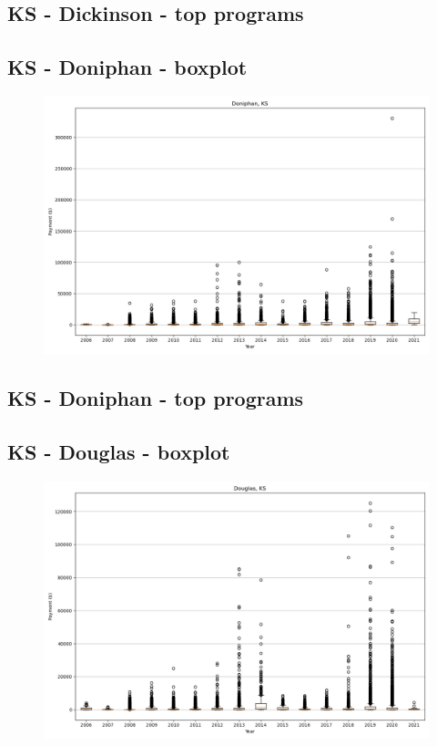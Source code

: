 \subsection*{KS - Dickinson - top programs}

\newpage
\subsection*{KS - Doniphan - boxplot}
\begin{figure}[h]
\centering
\includegraphics[width=7in]{../output/boxplots/counties/Doniphan-KS_boxplot.png}
\end{figure}


\subsection*{KS - Doniphan - top programs}

\newpage
\subsection*{KS - Douglas - boxplot}
\begin{figure}[h]
\centering
\includegraphics[width=7in]{../output/boxplots/counties/Douglas-KS_boxplot.png}
\end{figure}


